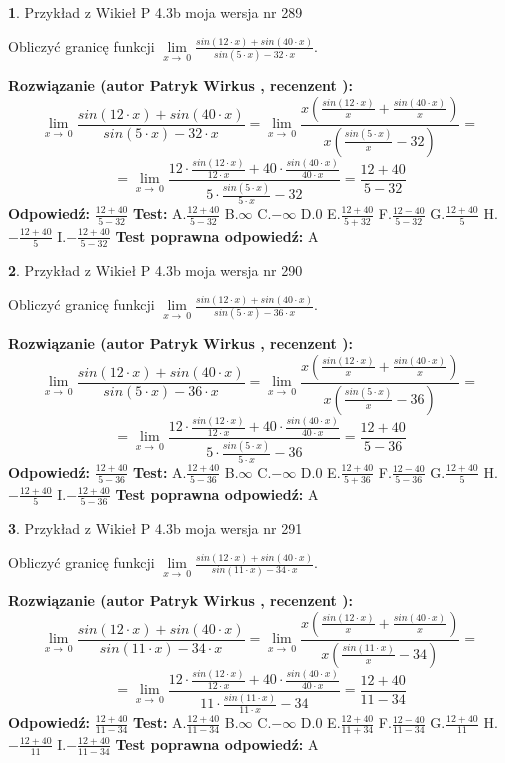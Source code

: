 \documentclass[12pt, a4paper]{article}
\theoremstyle{definition} %
\newtheorem{zad}{}
\newcommand{\zadStart}[1]{\begin{zad}#1\newline}
\newcommand{\zadStop}{\end{zad}}
\newcommand{\rozwStart}[2]{\noindent \textbf{Rozwiązanie (autor #1 , recenzent #2): }\newline}
\newcommand{\rozwStop}{\newline}
\newcommand{\odpStart}{\noindent \textbf{Odpowiedź:}\newline}
\newcommand{\odpStop}{\newline}
\newcommand{\testStart}{\noindent \textbf{Test:}\newline}
\newcommand{\testStop}{\newline}
\newcommand{\kluczStart}{\noindent \textbf{Test poprawna odpowiedź:}\newline}
\newcommand{\kluczStop}{\newline}
\begin{document}
\zadStart{Przykład z Wikieł P 4.3b moja wersja nr 289}


Obliczyć granicę funkcji $\lim\limits_{x\to\ 0}\frac{sin(12 \cdot x)+sin(40 \cdot x)}{sin(5 \cdot x)-32 \cdot x}$.
\zadStop
\rozwStart{Patryk Wirkus}{}
$$\lim\limits_{x\to\ 0}\frac{sin(12 \cdot x)+sin(40 \cdot x)}{sin(5 \cdot x)-32 \cdot x}=\lim\limits_{x\to\ 0}\frac{x(\frac{sin(12 \cdot x)}{x}+\frac{sin(40 \cdot x)}{x})}{x(\frac{sin(5 \cdot x)}{x}-32)}=$$
$$=\lim\limits_{x\to\ 0}\frac{12 \cdot \frac{sin(12 \cdot x)}{12 \cdot x}+40 \cdot \frac{sin(40 \cdot x)}{40 \cdot x}}{5 \cdot \frac{sin(5 \cdot x)}{5 \cdot x}-32}=\frac{12+40}{5-32}$$
\rozwStop
\odpStart
$\frac{12+40}{5-32}$
\odpStop
\testStart
A.$\frac{12+40}{5-32}$
B.$\infty$
C.$-\infty$
D.$0$
E.$\frac{12+40}{5+32}$
F.$\frac{12-40}{5-32}$
G.$\frac{12+40}{5}$
H.$-\frac{12+40}{5}$
I.$-\frac{12+40}{5-32}$
\testStop
\kluczStart
A
\kluczStop



\zadStart{Przykład z Wikieł P 4.3b moja wersja nr 290}


Obliczyć granicę funkcji $\lim\limits_{x\to\ 0}\frac{sin(12 \cdot x)+sin(40 \cdot x)}{sin(5 \cdot x)-36 \cdot x}$.
\zadStop
\rozwStart{Patryk Wirkus}{}
$$\lim\limits_{x\to\ 0}\frac{sin(12 \cdot x)+sin(40 \cdot x)}{sin(5 \cdot x)-36 \cdot x}=\lim\limits_{x\to\ 0}\frac{x(\frac{sin(12 \cdot x)}{x}+\frac{sin(40 \cdot x)}{x})}{x(\frac{sin(5 \cdot x)}{x}-36)}=$$
$$=\lim\limits_{x\to\ 0}\frac{12 \cdot \frac{sin(12 \cdot x)}{12 \cdot x}+40 \cdot \frac{sin(40 \cdot x)}{40 \cdot x}}{5 \cdot \frac{sin(5 \cdot x)}{5 \cdot x}-36}=\frac{12+40}{5-36}$$
\rozwStop
\odpStart
$\frac{12+40}{5-36}$
\odpStop
\testStart
A.$\frac{12+40}{5-36}$
B.$\infty$
C.$-\infty$
D.$0$
E.$\frac{12+40}{5+36}$
F.$\frac{12-40}{5-36}$
G.$\frac{12+40}{5}$
H.$-\frac{12+40}{5}$
I.$-\frac{12+40}{5-36}$
\testStop
\kluczStart
A
\kluczStop



\zadStart{Przykład z Wikieł P 4.3b moja wersja nr 291}


Obliczyć granicę funkcji $\lim\limits_{x\to\ 0}\frac{sin(12 \cdot x)+sin(40 \cdot x)}{sin(11 \cdot x)-34 \cdot x}$.
\zadStop
\rozwStart{Patryk Wirkus}{}
$$\lim\limits_{x\to\ 0}\frac{sin(12 \cdot x)+sin(40 \cdot x)}{sin(11 \cdot x)-34 \cdot x}=\lim\limits_{x\to\ 0}\frac{x(\frac{sin(12 \cdot x)}{x}+\frac{sin(40 \cdot x)}{x})}{x(\frac{sin(11 \cdot x)}{x}-34)}=$$
$$=\lim\limits_{x\to\ 0}\frac{12 \cdot \frac{sin(12 \cdot x)}{12 \cdot x}+40 \cdot \frac{sin(40 \cdot x)}{40 \cdot x}}{11 \cdot \frac{sin(11 \cdot x)}{11 \cdot x}-34}=\frac{12+40}{11-34}$$
\rozwStop
\odpStart
$\frac{12+40}{11-34}$
\odpStop
\testStart
A.$\frac{12+40}{11-34}$
B.$\infty$
C.$-\infty$
D.$0$
E.$\frac{12+40}{11+34}$
F.$\frac{12-40}{11-34}$
G.$\frac{12+40}{11}$
H.$-\frac{12+40}{11}$
I.$-\frac{12+40}{11-34}$
\testStop
\kluczStart
A
\kluczStop
\end{document}
